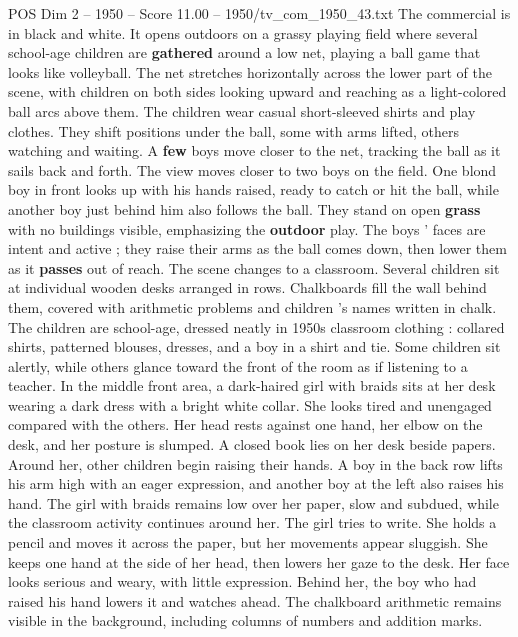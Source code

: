 \begin{textsample}{POS Dim 2 – 1950 – Score 11.00 – 1950/tv\_com\_1950\_43.txt}  \label{ex:f2_pos_087}
The commercial is in black and white.
It opens outdoors on a grassy playing field where several school-age children are \textbf{gathered} around a low net, playing a ball game that looks like volleyball.
The net stretches horizontally across the lower part of the scene, with children on both sides looking upward and reaching as a light-colored ball arcs above them.
The children wear casual short-sleeved shirts and play clothes.
They shift positions under the ball, some with arms lifted, others watching and waiting.
A \textbf{few} boys move closer to the net, tracking the ball as it sails back and forth.
The view moves closer to two boys on the field.
One blond boy in front looks up with his hands raised, ready to catch or hit the ball, while another boy just behind him also follows the ball.
They stand on open \textbf{grass} with no buildings visible, emphasizing the \textbf{outdoor} play.
The boys ’ faces are intent and active ; they raise their arms as the ball comes down, then lower them as it \textbf{passes} out of reach.
The scene changes to a classroom.
Several children sit at individual wooden desks arranged in rows.
Chalkboards fill the wall behind them, covered with arithmetic problems and children ’s names written in chalk.
The children are school-age, dressed neatly in 1950s classroom clothing : collared shirts, patterned blouses, dresses, and a boy in a shirt and tie.
Some children sit alertly, while others glance toward the front of the room as if listening to a teacher.
In the middle front area, a dark-haired girl with braids sits at her desk wearing a dark dress with a bright white collar.
She looks tired and unengaged compared with the others.
Her head rests against one hand, her elbow on the desk, and her posture is slumped.
A closed book lies on her desk beside papers.
Around her, other children begin raising their hands.
A boy in the back row lifts his arm high with an eager expression, and another boy at the left also raises his hand.
The girl with braids remains low over her paper, slow and subdued, while the classroom activity continues around her.
The girl tries to write.
She holds a pencil and moves it across the paper, but her movements appear sluggish.
She keeps one hand at the side of her head, then lowers her gaze to the desk.
Her face looks serious and weary, with little expression.
Behind her, the boy who had raised his hand lowers it and watches ahead.
The chalkboard arithmetic remains visible in the background, including columns of numbers and addition marks.

\end{textsample}
